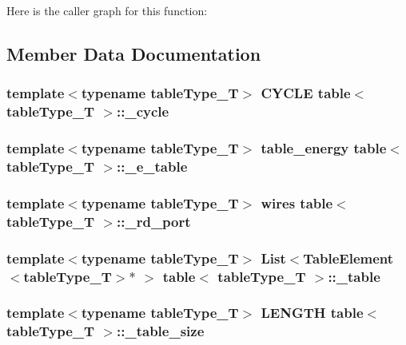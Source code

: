 Here is the caller graph for this function:




\subsection{Member Data Documentation}
\hypertarget{classtable_a64d740f2c6bbb938aac4a89bcbd76674}{
\subsubsection[{\_\-cycle}]{\setlength{\rightskip}{0pt plus 5cm}template$<$typename tableType\_\-T$>$ {\bf CYCLE} {\bf table}$<$ tableType\_\-T $>$::{\bf \_\-cycle}}}
\label{classtable_a64d740f2c6bbb938aac4a89bcbd76674}
\hypertarget{classtable_ad581f47c3a5858efcc8ea5377fe6c77a}{
\subsubsection[{\_\-e\_\-table}]{\setlength{\rightskip}{0pt plus 5cm}template$<$typename tableType\_\-T$>$ {\bf table\_\-energy} {\bf table}$<$ tableType\_\-T $>$::{\bf \_\-e\_\-table}}}
\label{classtable_ad581f47c3a5858efcc8ea5377fe6c77a}
\hypertarget{classtable_a55194c16991775949c0bc2e2ce0dd1de}{
\subsubsection[{\_\-rd\_\-port}]{\setlength{\rightskip}{0pt plus 5cm}template$<$typename tableType\_\-T$>$ {\bf wires} {\bf table}$<$ tableType\_\-T $>$::{\bf \_\-rd\_\-port}}}
\label{classtable_a55194c16991775949c0bc2e2ce0dd1de}
\hypertarget{classtable_aea78e74d4f44c1879df0c44e69d7bc26}{
\subsubsection[{\_\-table}]{\setlength{\rightskip}{0pt plus 5cm}template$<$typename tableType\_\-T$>$ {\bf List}$<${\bf TableElement}$<$tableType\_\-T$>$$\ast$ $>$ {\bf table}$<$ tableType\_\-T $>$::{\bf \_\-table}}}
\label{classtable_aea78e74d4f44c1879df0c44e69d7bc26}
\hypertarget{classtable_a7bb72e9a56072266491b5a125b41ef87}{
\subsubsection[{\_\-table\_\-size}]{\setlength{\rightskip}{0pt plus 5cm}template$<$typename tableType\_\-T$>$ {\bf LENGTH} {\bf table}$<$ tableType\_\-T $>$::{\bf \_\-table\_\-size}}}
